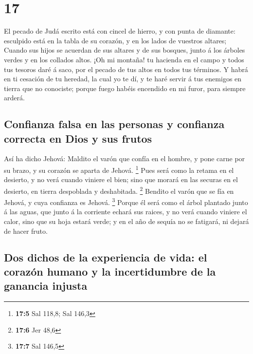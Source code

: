 \hypertarget{section-16}{%
\section{17}\label{section-16}}

 El pecado de Judá escrito está con cincel de hierro, y con
punta de diamante: esculpido está en la tabla de su corazón, y en los
lados de vuestros altares;  Cuando sus hijos se acuerdan de
sus altares y de sus bosques, junto á los árboles verdes y en los
collados altos.  ¡Oh mi montaña! tu hacienda en el campo y
todos tus tesoros daré á saco, por el pecado de tus altos en todos tus
términos.  Y habrá en ti cesación de tu heredad, la cual yo
te dí, y te haré servir á tus enemigos en tierra que no conociste;
porque fuego habéis encendido en mi furor, para siempre arderá.

\hypertarget{confianza-falsa-en-las-personas-y-confianza-correcta-en-dios-y-sus-frutos}{%
\subsection{Confianza falsa en las personas y confianza correcta en Dios
y sus
frutos}\label{confianza-falsa-en-las-personas-y-confianza-correcta-en-dios-y-sus-frutos}}

 Así ha dicho Jehová: Maldito el varón que confía en el
hombre, y pone carne por su brazo, y su corazón se aparta de Jehová.
\footnote{\textbf{17:5} Sal 118,8; Sal 146,3}  Pues será
como la retama en el desierto, y no verá cuando viniere el bien; sino
que morará en las securas en el desierto, en tierra despoblada y
deshabitada. \footnote{\textbf{17:6} Jer 48,6}  Bendito el
varón que se fía en Jehová, y cuya confianza es Jehová. \footnote{\textbf{17:7}
  Sal 146,5}  Porque él será como el árbol plantado junto á
las aguas, que junto á la corriente echará sus raices, y no verá cuando
viniere el calor, sino que su hoja estará verde; y en el año de sequía
no se fatigará, ni dejará de hacer fruto.

\hypertarget{dos-dichos-de-la-experiencia-de-vida-el-corazuxf3n-humano-y-la-incertidumbre-de-la-ganancia-injusta}{%
\subsection{Dos dichos de la experiencia de vida: el corazón humano y la
incertidumbre de la ganancia
injusta}\label{dos-dichos-de-la-experiencia-de-vida-el-corazuxf3n-humano-y-la-incertidumbre-de-la-ganancia-injusta}}

